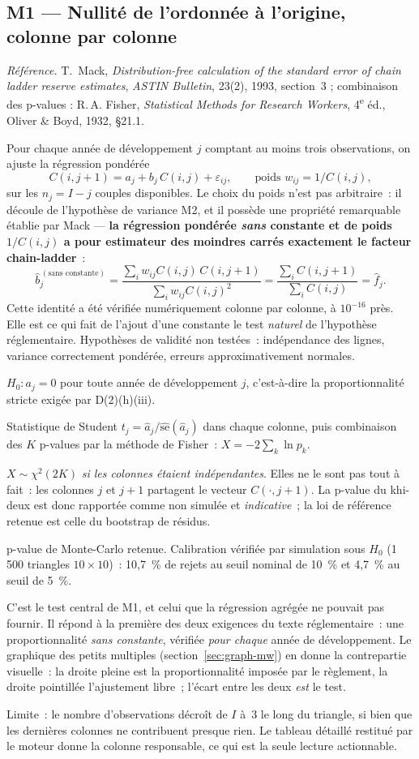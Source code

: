 \documentclass[a4paper,11pt]{article}
\newcommand{\refl}[1]{{\small\textcolor{maincolor!70!black}{\textit{Référence.} #1}}\par\smallskip}
\newcounter{ficheid}
\newenvironment{fiche}[1]{%
  \stepcounter{ficheid}%
  \phantomsection
  \subsection{#1}%
  \label{fiche:\theficheid}%
}{%
  \end{description}\vspace{0.5em}%
}
\newcommand{\Cadre}{%
  \begin{description}[leftmargin=0pt, style=unboxed, itemsep=3pt, topsep=3pt, parsep=2pt]%
  \item[\textcolor{financeblue}{\textbf{1. Cadre, notations et hypothèses de validité (non testées).}}]}
\newcommand{\Hzero}{\item[\textcolor{financeblue}{\textbf{2. Hypothèse nulle.}}]}
\newcommand{\Stat}{\item[\textcolor{financeblue}{\textbf{3. Statistique de test.}}]}
\newcommand{\Loi}{\item[\textcolor{financeblue}{\textbf{4. Loi sous $H_0$.}}]}
\newcommand{\Pval}{\item[\textcolor{financeblue}{\textbf{5. p-value.}}]}
\newcommand{\Usage}{\item[\textcolor{financeblue}{\textbf{6. Usage et limites.}}]}
\begin{document}
\begin{fiche}{M1 --- Nullité de l'ordonnée à l'origine, colonne par colonne}
\label{mw:m1a}
\refl{T.~Mack, \emph{Distribution-free calculation of the standard error of chain
ladder reserve estimates}, \emph{ASTIN Bulletin}, 23(2), 1993, section~3 ;
combinaison des p-values : R.\,A. Fisher, \emph{Statistical Methods for Research
Workers}, 4\textsuperscript{e} éd., Oliver \& Boyd, 1932, §21.1.}
\Cadre
Pour chaque année de développement $j$ comptant au moins trois observations, on
ajuste la régression pondérée
\[
  C(i,j+1) = a_j + b_j\,C(i,j) + \varepsilon_{ij},
  \qquad \text{poids } w_{ij} = 1/C(i,j),
\]
sur les $n_j = I-j$ couples disponibles. Le choix du poids n'est pas arbitraire~:
il découle de l'hypothèse de variance M2, et il possède une propriété
remarquable établie par Mack --- \textbf{la régression pondérée \emph{sans}
constante et de poids $1/C(i,j)$ a pour estimateur des moindres carrés
exactement le facteur chain-ladder}~:
\[
  \hat b_j^{\,(\text{sans constante})}
  = \frac{\sum_i w_{ij} C(i,j)\,C(i,j+1)}{\sum_i w_{ij} C(i,j)^2}
  = \frac{\sum_i C(i,j+1)}{\sum_i C(i,j)} = \hat f_j .
\]
Cette identité a été vérifiée numériquement colonne par colonne, à $10^{-16}$
près. Elle est ce qui fait de l'ajout d'une constante le test \emph{naturel} de
l'hypothèse réglementaire. Hypothèses de validité non testées~: indépendance des
lignes, variance correctement pondérée, erreurs approximativement normales.
\Hzero
$H_0 : a_j = 0$ pour toute année de développement $j$, c'est-à-dire la
proportionnalité stricte exigée par D(2)(h)(iii).
\Stat
Statistique de Student $t_j = \hat a_j / \widehat{\mathrm{se}}(\hat a_j)$ dans
chaque colonne, puis combinaison des $K$ p-values par la méthode de Fisher~:
$X = -2\sum_{k} \ln p_k$.
\Loi
$X \sim \chi^2(2K)$ \emph{si les colonnes étaient indépendantes}. Elles ne le
sont pas tout à fait~: les colonnes $j$ et $j+1$ partagent le vecteur
$C(\cdot,j+1)$. La p-value du khi-deux est donc rapportée comme non simulée et
\emph{indicative}~; la loi de référence retenue est celle du bootstrap de
résidus.
\Pval
p-value de Monte-Carlo retenue. Calibration vérifiée par simulation sous $H_0$
(1\,500 triangles $10\times10$)~: 10,7~\% de rejets au seuil nominal de 10~\% et
4,7~\% au seuil de 5~\%.
\Usage
C'est le test central de M1, et celui que la régression agrégée ne pouvait pas
fournir. Il répond à la première des deux exigences du texte réglementaire~: une
proportionnalité \emph{sans constante}, vérifiée \emph{pour chaque} année de
développement. Le graphique des petits multiples (section~\ref{sec:graph-mw})
en donne la contrepartie visuelle~: la droite pleine est la proportionnalité
imposée par le règlement, la droite pointillée l'ajustement libre~; l'écart
entre les deux \emph{est} le test.

\medskip
Limite~: le nombre d'observations décroît de $I$ à~3 le long du triangle, si
bien que les dernières colonnes ne contribuent presque rien. Le tableau détaillé
restitué par le moteur donne la colonne responsable, ce qui est la seule lecture
actionnable.
\end{fiche}
\end{document}
